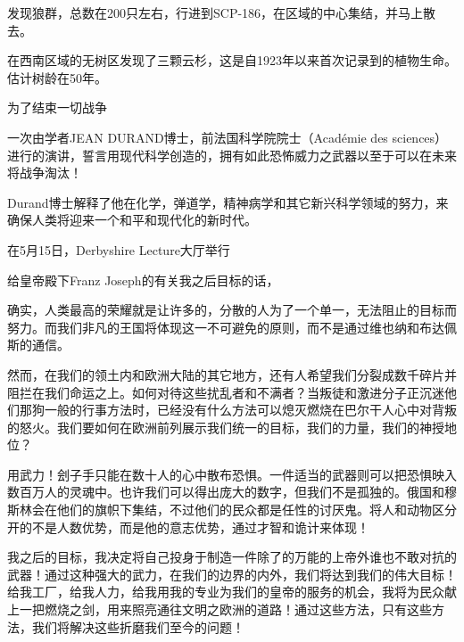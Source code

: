 发现狼群，总数在200只左右，行进到SCP-186，在区域的中心集结，并马上散去。

在西南区域的无树区发现了三颗云杉，这是自1923年以来首次记录到的植物生命。估计树龄在50年。




\begin{scpbox}

为了结束一切战争

一次由学者JEAN DURAND博士，前法国科学院院士（Académie des sciences）进行的演讲，誓言用现代科学创造的，拥有如此恐怖威力之武器以至于可以在未来将战争淘汰！

Durand博士解释了他在化学，弹道学，精神病学和其它新兴科学领域的努力，来确保人类将迎来一个和平和现代化的新时代。

在5月15日，Derbyshire Lecture大厅举行

\end{scpbox}


\begin{scpbox}

给皇帝殿下Franz Joseph的有关我之后目标的话，

确实，人类最高的荣耀就是让许多的，分散的人为了一个单一，无法阻止的目标而努力。而我们非凡的王国将体现这一不可避免的原则，而不是通过维也纳和布达佩斯的通信。

然而，在我们的领土内和欧洲大陆的其它地方，还有人希望我们分裂成数千碎片并阻拦在我们命运之上。如何对待这些扰乱者和不满者？当叛徒和激进分子正沉迷他们那狗一般的行事方法时，已经没有什么方法可以熄灭燃烧在巴尔干人心中对背叛的怒火。我们要如何在欧洲前列展示我们统一的目标，我们的力量，我们的神授地位？

用武力！刽子手只能在数十人的心中散布恐惧。一件适当的武器则可以把恐惧映入数百万人的灵魂中。也许我们可以得出庞大的数字，但我们不是孤独的。俄国和穆斯林会在他们的旗帜下集结，不过他们的民众都是任性的讨厌鬼。将人和动物区分开的不是人数优势，而是他的意志优势，通过才智和诡计来体现！

我之后的目标，我决定将自己投身于制造一件除了的万能的上帝外谁也不敢对抗的武器！通过这种强大的武力，在我们的边界的内外，我们将达到我们的伟大目标！给我工厂，给我人力，给我用我的专业为我们的皇帝的服务的机会，我将为民众献上一把燃烧之剑，用来照亮通往文明之欧洲的道路！通过这些方法，只有这些方法，我们将解决这些折磨我们至今的问题！

\end{scpbox}

